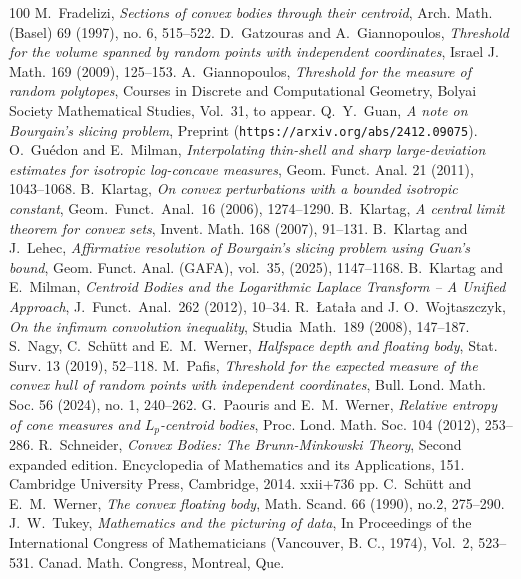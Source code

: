 \documentclass[11pt,leqno]{article}
\theoremstyle{definition}
\theoremstyle{remark}
\numberwithin{equation}{section}
\newcommand{\1}{\textbf{1}}
\begin{document}
\begin{thebibliography}{100}
 {\rm M.\ Fradelizi}, \textit{Sections of convex bodies through their centroid},
Arch. Math. (Basel) {69} (1997), no. 6, 515--522.
 {\rm D.\ Gatzouras and A.\ Giannopoulos}, \textit{Threshold for the volume
spanned by random points with independent coordinates}, Israel J. Math. {169} (2009), 125--153.
 {\rm A.~Giannopoulos}, \textit{Threshold for the measure of random polytopes},
Courses in Discrete and Computational Geometry, Bolyai Society Mathematical Studies, Vol.~31, to appear.
 Q.~Y.~Guan, \textit{A note on Bourgain's slicing problem}, Preprint ({\tt https://arxiv.org/abs/2412.09075}).
 {\rm O.\ Gu\'{e}don and E.\ Milman}, \textit{Interpolating thin-shell and
sharp large-deviation estimates for isotropic log-concave measures}, Geom. Funct. Anal. {21} (2011), 1043--1068.
 {\rm B.\ Klartag}, \textit{On convex perturbations with a bounded isotropic constant},
Geom.\ Funct.\ Anal.\ {16} (2006), 1274--1290.
 {\rm B.\ Klartag}, \textit{A central limit theorem for convex sets}, Invent. Math. {168} (2007), 91--131.
 B.~Klartag and J.~Lehec, \textit{Affirmative resolution of Bourgain's slicing problem using
Guan's bound}, Geom. Funct. Anal. (GAFA), vol.~35, (2025), 1147--1168.
 {\rm B.\ Klartag and E.\ Milman}, \textit{Centroid Bodies and the
Logarithmic Laplace Transform -- A Unified Approach}, J.\ Funct.\ Anal.\ {262} (2012), 10--34.
 {\rm R.\ \L ata\l a and J. O.\ Wojtaszczyk}, \textit{On the infimum convolution inequality},
Studia\ Math.\ {189} (2008), 147--187.
 \textrm{S.\ Nagy, C.\ Sch\"{u}tt and E.\ M.\ Werner},
\textit{Halfspace depth and floating body}, Stat. Surv. {13} (2019), 52--118.
 M.\ Pafis, \textit{Threshold for the expected measure of the convex hull of random points with
independent coordinates}, Bull. Lond. Math. Soc. {56} (2024), no. 1, 240--262.
 {G.\ Paouris and E.\ M.\ Werner}, \textit{Relative entropy of cone measures
and $L_p$-centroid bodies}, Proc. Lond. Math. Soc. {104} (2012), 253--286.
 {\rm R.\ Schneider}, \textit{Convex Bodies: The Brunn-Minkowski Theory},
Second expanded edition. Encyclopedia of Mathematics and its Applications, 151.
Cambridge University Press, Cambridge, 2014. xxii+736 pp.
 {\rm C.\ Sch\"{u}tt and E.\ M.\ Werner}, \textit{The convex floating body},
Math. Scand. {66} (1990), no.2, 275--290.
 \textrm{J.\ W.\ Tukey}, \textit{Mathematics and the picturing of data}, In Proceedings
of the International Congress of Mathematicians (Vancouver, B. C., 1974), Vol.~2, 523--531. Canad. Math. Congress, Montreal, Que.
\end{thebibliography}
\end{document}
